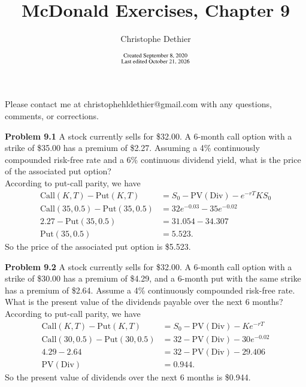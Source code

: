\documentclass[12pt]{article}
\title{McDonald Exercises, Chapter 9}
\author{Christophe Dethier}
\date{$\substack{\text{Created September 8, 2020}\\\text{Last edited \today}}$}
\newcommand{\problem}[1]{\bigskip \noindent \textbf{Problem #1}}
\newcommand{\Call}{\text{Call}}
\newcommand{\Put}{\text{Put}}
\newcommand{\PV}{\text{PV}}
\theoremstyle{plain}
\begin{document}
\bigskip
\maketitle

Please contact me at christophehldethier@gmail.com with any questions, comments, or corrections.

\problem{9.1} A stock currently sells for \$32.00. A 6-month call option with a strike of \$35.00 has a premium of \$2.27. Assuming a 4\% continuously compounded risk-free rate and a 6\% continuous dividend yield, what is the price of the associated put option?\\

According to put-call parity, we have
\begin{align*}
\Call(K,T) - \Put(K,T) &=S_0 - \PV(\text{Div})- e^{-rT}KS_0 \\
\Call(35,0.5) - \Put(35,0.5) &= 32e^{-0.03}- 35e^{-0.02}\\
2.27 - \Put(35,0.5) &=  31.054-34.307\\
\Put(35,0.5) &= 5.523.
\end{align*}
So the price of the associated put option is \$5.523.

\problem{9.2} A stock currently sells for \$32.00. A 6-month call option with a strike of \$30.00 has a premium of \$4.29, and a 6-month put with the same strike has a premium of \$2.64. Assume a 4\% continuously compounded risk-free rate. What is the present value of the dividends payable over the next 6 months?\\

According to put-call parity, we have
\begin{align*}
\Call(K,T) - \Put(K,T) &= S_0 - \PV(\text{Div}) - Ke^{-rT}\\
\Call(30,0.5) - \Put(30,0.5) &= 32 - \PV(\text{Div}) - 30e^{-0.02}\\
4.29 - 2.64 &= 32 - \PV(\text{Div}) - 29.406\\
\PV(\text{Div}) &= 0.944.
\end{align*}
So the present value of dividends over the next 6 months is \$0.944.
\end{document}
